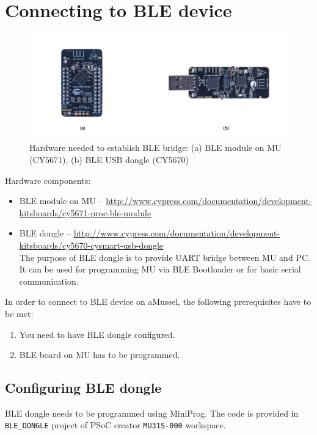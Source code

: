 \chapter{Connecting to BLE device}
\label{ch:connecting_to_ble}

\begin{figure}[htb]
    \centering
	  \includegraphics[width=0.8\linewidth]{figures/BLE_module_Dongle.pdf}
	\caption{Hardware needed to establish BLE bridge: (a) BLE module on MU (CY5671), (b) BLE USB dongle (CY5670)}
	\label{fig:ble_hardware}
\end{figure}

Hardware components:
\begin{itemize}
	\item BLE module on MU -- \url{http://www.cypress.com/documentation/development-kitsboards/cy5671-proc-ble-module} 
	\item BLE dongle -- \url{http://www.cypress.com/documentation/development-kitsboards/cy5670-cysmart-usb-dongle} \\
	The purpose of BLE dongle is to provide UART bridge between MU and PC. It can be used for programming MU via BLE Bootloader or for basic serial communication.
\end{itemize}

In order to connect to BLE device on aMussel, the following prerequisites have to be met:
\begin{enumerate}
	\item You need to have BLE dongle configured.
	\item BLE board on MU has to be programmed.
\end{enumerate}

\section{Configuring BLE dongle}

BLE dongle needs to be programmed using MiniProg. The code is provided in \texttt{BLE\_DONGLE} project of PSoC creator \texttt{MU31S-000} workspace.

